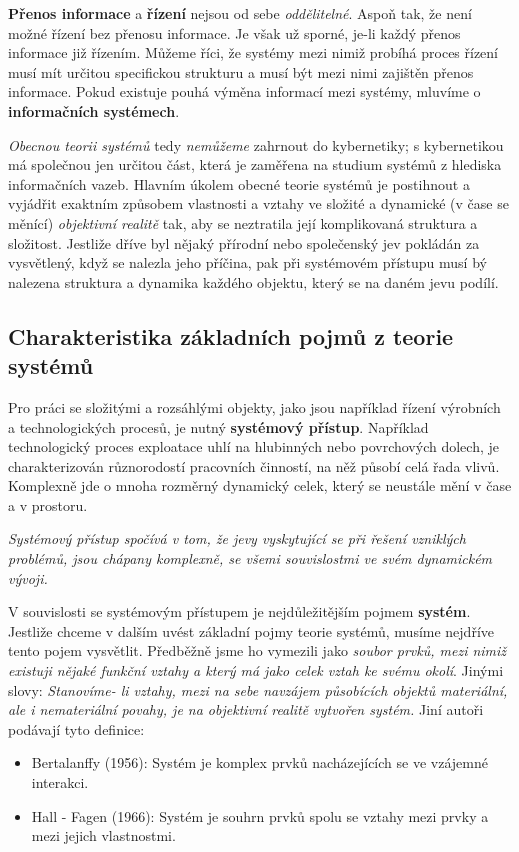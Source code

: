 {     \textbf{Přenos informace} a \textbf{řízení} nejsou od sebe \emph{oddělitelné}. Aspoň tak, že 
     není možné řízení bez přenosu informace. Je však už sporné, je-li každý přenos informace již 
     řízením. Můžeme říci, že systémy mezi nimiž probíhá proces řízení musí mít určitou specifickou 
     strukturu a musí být mezi nimi zajištěn přenos informace. Pokud existuje pouhá výměna 
     informací mezi systémy, mluvíme o \textbf{informačních systémech}.
     
     \emph{Obecnou teorii systémů} tedy \emph{nemůžeme} zahrnout do kybernetiky; s kybernetikou má 
     společnou jen určitou část, která je zaměřena na studium systémů z hlediska informačních 
     vazeb. Hlavním úkolem obecné teorie systémů je postihnout a vyjádřit exaktním způsobem 
     vlastnosti a vztahy ve složité a dynamické (v čase se měnící) \emph{objektivní realitě} tak, 
     aby se neztratila její komplikovaná struktura a složitost. Jestliže dříve byl nějaký přírodní 
     nebo společenský jev pokládán za vysvětlený, když se nalezla jeho příčina, pak při systémovém 
     přístupu musí bý nalezena struktura a dynamika každého objektu, který se na daném jevu podílí.
     
     \subsection{Charakteristika základních pojmů z teorie systémů}
       Pro práci se složitými a rozsáhlými objekty, jako jsou například řízení výrobních a
       technologických procesů, je nutný \textbf{systémový přístup}. Například technologický proces
       exploatace uhlí na hlubinných nebo povrchových dolech, je charakterizován různorodostí
       pracovních činností, na něž působí celá řada vlivů. Komplexně jde o mnoha rozměrný
       dynamický celek, který se neustále mění v čase a v prostoru.
       
       \emph{Systémový přístup spočívá v tom, že jevy vyskytující se při řešení vzniklých problémů, 
       jsou chápany komplexně, se všemi souvislostmi ve svém dynamickém vývoji.}
       
       V souvislosti se systémovým přístupem je nejdůležitějším pojmem \textbf{systém}. Jestliže 
       chceme v dalším uvést základní pojmy teorie systémů, musíme nejdříve tento pojem vysvětlit. 
       Předběžně jsme ho vymezili jako \emph{soubor prvků, mezi nimiž existuji nějaké funkční 
       vztahy a který má jako celek vztah ke svému okolí}. Jinými slovy: \emph{Stanovíme- li 
       vztahy, mezi na sebe navzájem působících objektů materiální, ale i nemateriální povahy, je na
       objektivní realitě vytvořen systém.} Jiní autoři podávají tyto definice:
       \begin{itemize}\addtolength{\itemsep}{-0.5\baselineskip}
         \item Bertalanffy (1956): Systém je komplex prvků nacházejících se ve vzájemné interakci.
         \item Hall - Fagen (1966): Systém je souhrn prvků spolu se vztahy mezi prvky a mezi jejich 
               vlastnostmi.
       \end{itemize}

}
